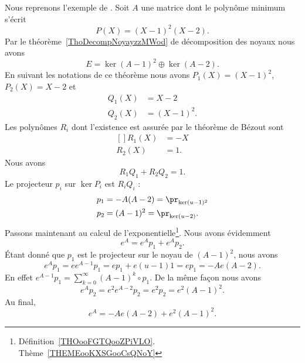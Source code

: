 Nous reprenons l'exemple de \cite{MneimneReduct}. Soit \( A\) une matrice dont le polynôme minimum s'écrit
\begin{equation}
	P(X)=(X-1)^2(X-2).
\end{equation}
Par le théorème~\ref{ThoDecompNoyayzzMWod} de décomposition des noyaux nous avons
\begin{equation}
	E=\ker(A-1)^2\oplus\ker(A-2).
\end{equation}
En suivant les notations de ce théorème nous avons \( P_1(X)=(X-1)^2\), \( P_2(X)=X-2\) et
\begin{subequations}
	\begin{align}
		Q_1(X) & =X-2      \\
		Q_2(X) & =(X-1)^2.
	\end{align}
\end{subequations}
Les polynômes \( R_i\) dont l'existence est assurée par le théorème de Bézout sont
\begin{equation}
	\begin{aligned}[]
		R_1(X) & =-X \\
		R_2(X) & =1.
	\end{aligned}
\end{equation}
Nous avons
\begin{equation}
	R_1Q_1+R_2Q_2=1.
\end{equation}
Le projecteur \( p_i\) sur \( \ker P_i\) est \( R_iQ_i\) :
\begin{equation}
	\begin{aligned}[]
		p_1 & =-A(A-2)=\pr_{\ker(u-1)^2} \\
		p_2 & =(A-1)^2=\pr_{\ker(u-2)}.
	\end{aligned}
\end{equation}
Passons maintenant au calcul de l'exponentielle\footnote{Définition~\ref{THOooFGTQooZPiVLO}. Thème~\ref{THEMEooKXSGooCsQNoY}}. Nous avons évidemment
\begin{equation}
	e^A=e^Ap_1+e^Ap_2.
\end{equation}
Étant donné que \( p_1\) est le projecteur sur le noyau de \( (A-1)^2\), nous avons
\begin{equation}
	e^Ap_1=ee^{A-1}p_1=ep_1+e(u-1)1=ep_1=-Ae(A-2).
\end{equation}
En effet \( e^{A-1}p_1=\sum_{k=0}^{\infty}(A-1)^k\circ p_1\). De la même façon nous avons
\begin{equation}
	e^Ap_2=e^2e^{A-2}p_2=e^2p_2=e^2(A-1)^2.
\end{equation}
Au final,
\begin{equation}
	e^A=-Ae(A-2)+e^2(A-1)^2.
\end{equation}

